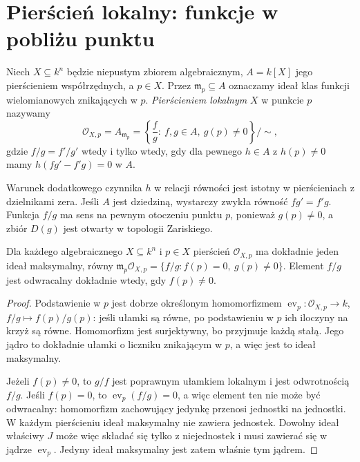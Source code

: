 \section{Pierścień lokalny: funkcje w pobliżu punktu}

\begin{definicja}
\label{def:local-ring-point}
Niech $X\subseteq k^n$ będzie niepustym zbiorem algebraicznym,
$A=k[X]$ jego pierścieniem współrzędnych, a $p\in X$.
Przez $\mathfrak m_p\subseteq A$ oznaczamy ideał klas
funkcji wielomianowych znikających w $p$.
\emph{Pierścieniem lokalnym} $X$ w punkcie $p$ nazywamy
\[
 \mathcal O_{X,p}=A_{\mathfrak m_p}
 =\left\{\frac fg:\ f,g\in A,\ g(p)\ne0\right\}/\!\sim,
\]
gdzie $f/g=f'/g'$ wtedy i tylko wtedy, gdy dla pewnego
$h\in A$ z $h(p)\ne0$ mamy $h(fg'-f'g)=0$ w $A$.
\end{definicja}

Warunek dodatkowego czynnika $h$ w relacji równości jest
istotny w pierścieniach z dzielnikami zera. Jeśli $A$
jest dziedziną, wystarczy zwykła równość $fg'=f'g$.
Funkcja $f/g$ ma sens na pewnym otoczeniu punktu $p$,
ponieważ $g(p)\ne0$, a zbiór $D(g)$ jest otwarty
w topologii Zariskiego.

\begin{twierdzenie}
\label{tw:local-unique-max}
Dla każdego algebraicznego $X\subseteq k^n$ i $p\in X$
pierścień $\mathcal O_{X,p}$ ma dokładnie jeden ideał
maksymalny, równy
$\mathfrak m_p\mathcal O_{X,p}=\{f/g:f(p)=0,\ g(p)\ne0\}$.
Element $f/g$ jest odwracalny dokładnie wtedy, gdy $f(p)\ne0$.
\end{twierdzenie}
\begin{proof}
Podstawienie w $p$ jest dobrze określonym homomorfizmem
$\operatorname{ev}_p:\mathcal O_{X,p}\to k$,
$f/g\mapsto f(p)/g(p)$: jeśli ułamki są równe,
po podstawieniu w $p$ ich iloczyny na krzyż są równe.
Homomorfizm jest surjektywny, bo przyjmuje każdą stałą.
Jego jądro to dokładnie ułamki o liczniku znikającym w $p$,
a więc jest to ideał maksymalny.

Jeżeli $f(p)\ne0$, to $g/f$ jest poprawnym ułamkiem
lokalnym i jest odwrotnością $f/g$. Jeśli $f(p)=0$,
to $\operatorname{ev}_p(f/g)=0$, a więc element ten nie
może być odwracalny: homomorfizm zachowujący jedynkę
przenosi jednostki na jednostki.
W każdym pierścieniu ideał maksymalny nie zawiera jednostek.
Dowolny ideał właściwy $J$ może więc składać się tylko
z niejednostek i musi zawierać się w jądrze
$\operatorname{ev}_p$. Jedyny ideał maksymalny jest zatem
właśnie tym jądrem.
\end{proof}

